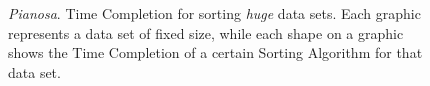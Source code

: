 \begin{figure}[!ht]  	
  	\centering
	
	\centering
  	
	\caption{\textit{Pianosa}. Time Completion for sorting \textit{huge} data sets. Each graphic represents a data set of fixed size, while each shape on a graphic shows the Time Completion of a certain Sorting Algorithm for that data set.}
	\label{NxTxA-huge}
\end{figure} 

